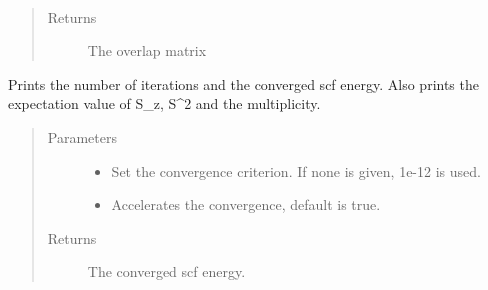 \documentclass[letterpaper,10pt,english]{sphinxmanual}
\begin{document}
\begin{fulllineitems}

\begin{fulllineitems}
\label{\detokenize{cUHF_s:hf.cUHF_s.CUHF.get_ovlp}}~\begin{quote}\begin{description}
\item[{Returns}] \leavevmode
The overlap matrix

\end{description}\end{quote}

\end{fulllineitems}


\begin{fulllineitems}
\label{\detokenize{cUHF_s:hf.cUHF_s.CUHF.get_scf_solution}}
Prints the number of iterations and the converged scf energy.
Also prints the expectation value of S\_z, S\textasciicircum{}2 and the multiplicity.
\begin{quote}\begin{description}
\item[{Parameters}] \leavevmode\begin{itemize}
\item {} 
 \textendash{} Set the convergence criterion. If none is given, 1e-12 is used.

\item {} 
 \textendash{} Accelerates the convergence, default is true.

\end{itemize}

\item[{Returns}] \leavevmode
The converged scf energy.

\end{description}\end{quote}

\end{fulllineitems}



\end{fulllineitems}
\end{document}
